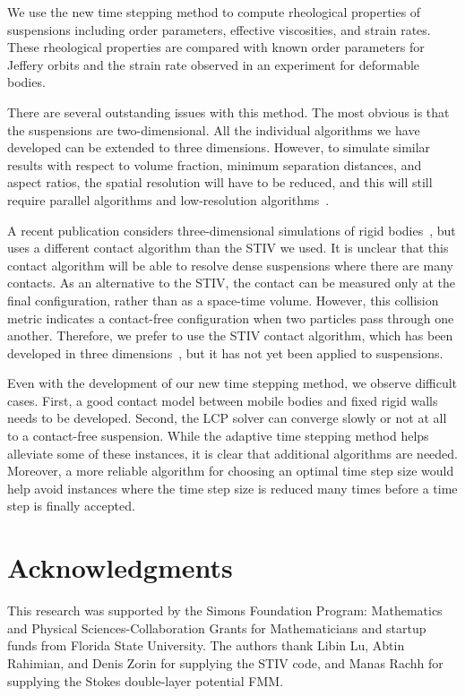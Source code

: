 \documentclass[AMA,STIX1COL]{WileyNJD-v2}
\begin{document}
We use the new time stepping method to compute rheological properties of
suspensions including order parameters, effective viscosities, and
strain rates.  These rheological properties are compared with known
order parameters for Jeffery orbits and the strain rate observed in an
experiment for deformable bodies.

There are several outstanding issues with this method. The most obvious
is that the suspensions are two-dimensional.  All the individual
algorithms we have developed can be extended to three dimensions.
However, to simulate similar results with respect to volume fraction,
minimum separation distances, and aspect ratios, the spatial resolution
will have to be reduced, and this will still require parallel algorithms
and low-resolution algorithms~\cite{Kabacogulu2017}.  

A recent publication considers three-dimensional simulations of rigid
bodies~\cite{cor-gre-rac-vee2017}, but uses a different contact
algorithm than the STIV we used.  It is unclear that this contact
algorithm will be able to resolve dense suspensions where there are many
contacts.  As an alternative to the STIV, the contact can be measured
only at the final configuration, rather than as a space-time volume.
However, this collision metric indicates a contact-free configuration
when two particles pass through one another.  Therefore, we prefer to
use the STIV contact algorithm, which has been developed in three
dimensions~\cite{Harmon2011}, but it has not yet been applied to
suspensions.

Even with the development of our new time stepping method, we observe
difficult cases.  First, a good contact model between mobile bodies and
fixed rigid walls needs to be developed.  Second, the LCP solver can
converge slowly or not at all to a contact-free suspension.  While the
adaptive time stepping method helps alleviate some of these instances,
it is clear that additional algorithms are needed. Moreover, a more
reliable algorithm for choosing an optimal time step size would help
avoid instances where the time step size is reduced many times before a
time step is finally accepted.

\section*{Acknowledgments}
This research was supported by the Simons Foundation Program:
Mathematics and Physical Sciences-Collaboration Grants for
Mathematicians and startup funds from Florida State University.  The
authors thank Libin Lu, Abtin Rahimian, and Denis Zorin for supplying
the STIV code, and Manas Rachh for supplying the Stokes double-layer
potential FMM.

%
\end{document}
